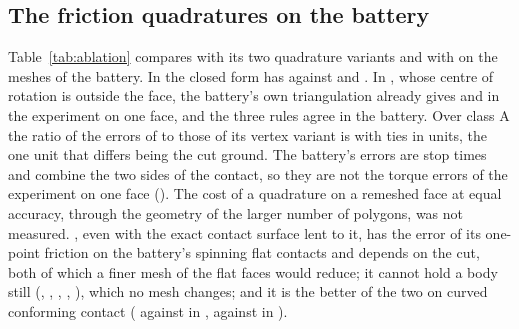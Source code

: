 \subsection{The friction quadratures on the battery}

Table~\ref{tab:ablation} compares  with its two quadrature variants and with
 on the meshes of the battery. In  the closed form has
 against  and
. In , whose centre of rotation is outside the face,
the battery's own triangulation already gives 
and  in the experiment on one face, and the three
rules agree in the battery. Over class A the ratio of the errors of  to those
of its vertex variant is  with
 ties in 
units, the one unit that differs being the cut ground. The battery's errors are stop times and
combine the two sides of the contact, so they are not the torque errors of the experiment on
one face (). The cost of a quadrature on a remeshed face
at equal accuracy, through the geometry of the larger number of polygons, was not measured.
, even with the exact contact surface lent to it, has the error of its one-point
friction on the battery's spinning flat contacts and depends on the cut, both of which a finer
mesh of the flat faces would reduce; it cannot hold a body still (, ,
, , ), which no mesh changes; and it is the better of the two on
curved conforming contact ( against  in
,  against  in
).

\begin{table}[!htbp]
\caption{The battery, on its own meshes (flat caps: fans from a rim vertex; grounds: two
triangles per face): error [\%] of the distributed law with the closed-form friction, with the
vertex rule and with the one-point rule, and of the per-face foundation, on the flat spinning
contacts under refinement of the curved meshes (1\,ms) and on the ground cut into pieces}
\label{tab:ablation}
\end{table}


